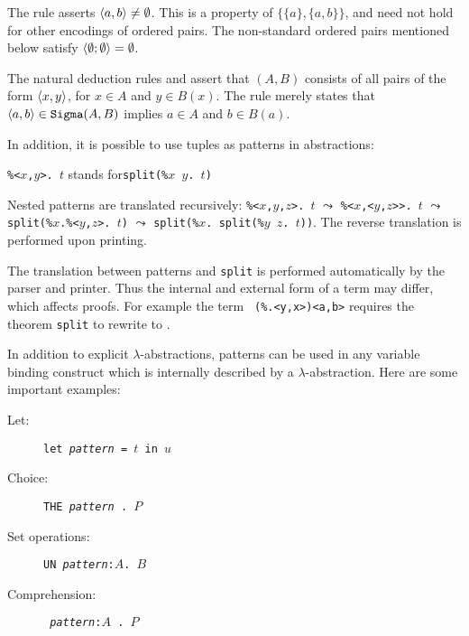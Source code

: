The rule  asserts $\langle a,b\rangle\neq\emptyset$.  This
is a property of $\{\{a\},\{a,b\}\}$, and need not hold for other 
encodings of ordered pairs.  The non-standard ordered pairs mentioned below
satisfy $\langle\emptyset;\emptyset\rangle=\emptyset$.

The natural deduction rules  and 
assert that $(A,B)$ consists of all pairs of the form
$\langle x,y\rangle$, for $x\in A$ and $y\in B(x)$.  The rule 
merely states that $\langle a,b\rangle\in \texttt{Sigma}(A,B)$ implies $a\in A$ and
$b\in B(a)$.

In addition, it is possible to use tuples as patterns in abstractions:
\begin{center}
{\tt\%<$x$,$y$>. $t$} \quad stands for\quad \texttt{split(\%$x$ $y$.\ $t$)}
\end{center}
Nested patterns are translated recursively:
{\tt\%<$x$,$y$,$z$>. $t$} $\leadsto$ {\tt\%<$x$,<$y$,$z$>>. $t$} $\leadsto$
\texttt{split(\%$x$.\%<$y$,$z$>. $t$)} $\leadsto$ \texttt{split(\%$x$. split(\%$y$
  $z$.\ $t$))}.  The reverse translation is performed upon printing.
\begin{warn}
  The translation between patterns and \texttt{split} is performed automatically
  by the parser and printer.  Thus the internal and external form of a term
  may differ, which affects proofs.  For example the term {\tt
    (\%<x,y>.<y,x>)<a,b>} requires the theorem \texttt{split} to rewrite to
  {\tt<b,a>}.
\end{warn}
In addition to explicit $\lambda$-abstractions, patterns can be used in any
variable binding construct which is internally described by a
$\lambda$-abstraction.  Here are some important examples:
\begin{description}
\item[Let:] \texttt{let {\it pattern} = $t$ in $u$}
\item[Choice:] \texttt{THE~{\it pattern}~.~$P$}
\item[Set operations:] \texttt{UN~{\it pattern}:$A$.~$B$}
\item[Comprehension:] \texttt{{\ttlbrace}~{\it pattern}:$A$~.~$P$~{\ttrbrace}}
\end{description}



